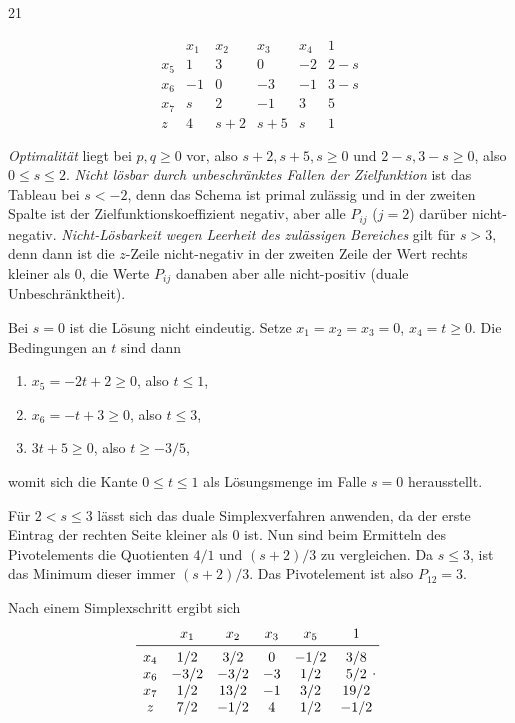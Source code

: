 21
\begin{exercise}
    $$
    \begin{matrix}
        & x_1 & x_2 & x_3 & x_4 & 1 \\
        x_5 & 1 & 3 & 0 & -2 & 2-s \\
        x_6 & -1 & 0 & -3 & -1 & 3-s \\
        x_7 & s & 2 & -1 & 3 & 5 \\
        z & 4 & s+2 & s+5 & s & 1 
    \end{matrix}
    $$
\end{exercise}

\begin{solution}
    \begin{tasks}
            \item \emph{Optimalität} liegt bei $p,q\geq 0$ vor, also $s+2,s+5,s\geq 0$ und $2-s,3-s\geq 0$, also $0\leq s\leq 2$.
        \emph{Nicht lösbar durch unbeschränktes Fallen der Zielfunktion} ist das Tableau bei $s< -2$, denn das Schema ist primal zulässig und in der zweiten Spalte ist der Zielfunktionskoeffizient negativ, aber alle $P_{ij}$ ($j=2$) darüber nicht-negativ.
        \emph{Nicht-Lösbarkeit wegen Leerheit des zulässigen Bereiches} gilt für $s>3$, denn dann ist die $z$-Zeile nicht-negativ in der zweiten Zeile der Wert rechts kleiner als $0$, die Werte $P_{ij}$ danaben aber alle nicht-positiv (duale Unbeschränktheit).
            \item Bei $s=0$ ist die Lösung nicht eindeutig. Setze $x_1=x_2=x_3=0$, $x_4=t\geq 0$. Die Bedingungen an $t$ sind dann
        \begin{enumerate}
                \item $x_5 = -2t+2\geq 0$, also $t\leq 1$,
                \item $x_6 = -t+3\geq 0$, also $t\leq 3$,
            \item $3t+5\geq 0$, also $t\geq -3/5$,
        \end{enumerate}
        womit sich die Kante $0\leq t\leq 1$ als Lösungsmenge im Falle $s=0$ herausstellt.
            \item Für $2<s\leq 3$ lässt sich das duale Simplexverfahren anwenden, da der erste Eintrag der rechten Seite kleiner als $0$ ist. Nun sind beim Ermitteln des Pivotelements die Quotienten $4/1$ und $(s+2)/3$ zu vergleichen. Da $s\leq 3$, ist das Minimum dieser immer $(s+2)/3$. Das Pivotelement ist also $P_{12}=3$.
            \item Nach einem Simplexschritt ergibt sich
        $$
        \begin{matrix}
            & x_1 & x_2 & x_3 & x_5 & 1 \\
            \midrule
            x_4 & 1/2 & 3/2 & 0 & -1/2 & 3/8 \\
            x_6 & -3/2 & -3/2 & -3 & 1/2 & 5/2 \\
            x_7 & 1/2 & 13/2 & -1 & 3/2 & 19/2 \\
            z & 7/2 & -1/2 & 4 & 1/2 & -1/2 
        \end{matrix}.
        $$
    \end{tasks}
    
\end{solution}